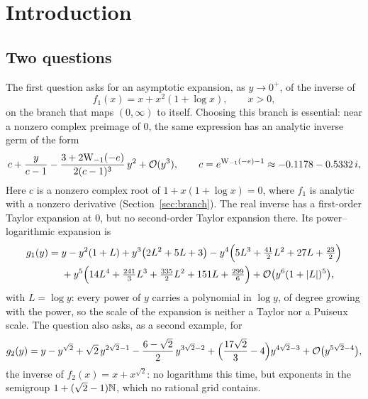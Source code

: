 \section{Introduction}
\label{sec:intro}

\subsection{Two questions}

The first question \cite{q1} asks for an asymptotic expansion, as $y\to0^+$, of the inverse of
\begin{equation}
 f_1(x)=x+x^2(1+\log x),\qquad x>0,
 \label{eq:f1}
\end{equation}
on the branch that maps $(0,\infty)$ to itself. Choosing this branch is essential: near a nonzero complex preimage of $0$, the same expression has an analytic inverse germ of the form
\begin{equation}
 c+\frac{y}{c-1}-\frac{3+2\mathrm W_{-1}(-e)}{2(c-1)^3}\,y^2+\mathcal O(y^3),\qquad c=e^{\mathrm W_{-1}(-e)-1}\approx-0.1178-0.5332\,i,
 \label{eq:complex-germ}
\end{equation}
Here $c$ is a nonzero complex root of $1+x(1+\log x)=0$, where $f_1$ is analytic with a nonzero derivative (Section~\ref{sec:branch}). The real inverse has a first-order Taylor expansion at $0$, but no second-order Taylor expansion there. Its power--logarithmic expansion is
\begin{equation}
\begin{aligned}
 g_1(y)={}&y-y^2(1+L)+y^3\bigl(2L^2+5L+3\bigr)-y^4\Bigl(5L^3+\tfrac{41}{2}L^2+27L+\tfrac{23}{2}\Bigr)\\
 &+y^5\Bigl(14L^4+\tfrac{241}{3}L^3+\tfrac{335}{2}L^2+151L+\tfrac{299}{6}\Bigr)+\mathcal O\bigl(y^6(1+|L|)^5\bigr),
\end{aligned}
 \label{eq:answer1}
\end{equation}
with $L=\log y$: every power of $y$ carries a polynomial in $\log y$, of degree growing with the power, so the scale of the expansion is neither a Taylor nor a Puiseux scale. The question also asks, as a second example, for
\begin{equation}
 g_2(y)=y-y^{\sqrt2}+\sqrt2\,y^{2\sqrt2-1}-\frac{6-\sqrt2}{2}\,y^{3\sqrt2-2}+\Bigl(\frac{17\sqrt2}{3}-4\Bigr)y^{4\sqrt2-3}+\mathcal O\bigl(y^{5\sqrt2-4}\bigr),
 \label{eq:answer2}
\end{equation}
the inverse of $f_2(x)=x+x^{\sqrt2}$: no logarithms this time, but exponents in the semigroup $1+(\sqrt2-1)\mathbb N$, which no rational grid contains.

